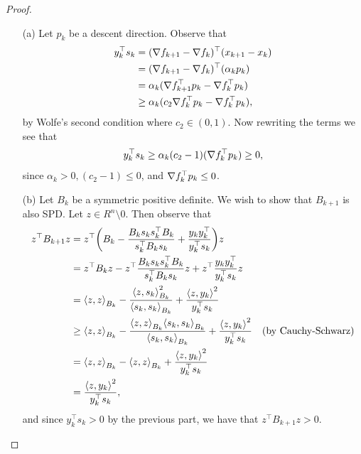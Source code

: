 \documentclass[12pt]{report}
\begin{document}
\begin{problem}
\begin{proof}
\begin{enumerate}
    \item [(a)]
    Let $p_k$ be a descent direction. Observe that
    \begin{align*}
        y_k^\top s_k &= ( {\nabla} f_{k+1} - {\nabla} f_k)^\top(x_{k+1} - x_k)\\
        &= ({\nabla} f_{k+1} - {\nabla} f_k)^\top (\alpha_k p_k)\\
        &= \alpha_k({\nabla} f_{k+1}^\top p_k - {\nabla} f_k^\top p_k)\\
        &\geq  \alpha_k(c_2{\nabla} f_{k}^\top p_k - {\nabla} f_k^\top p_k),
    \end{align*}
    by Wolfe's second condition where $c_2 \in (0,1)$. Now rewriting the terms we see that
    \[
        y_k^\top s_k \geq \alpha_k(c_2 -1)({\nabla} f_{k}^\top p_k) \geq 0,
    \]
    since $\alpha_k > 0, (c_2 - 1) \leq 0$, and ${\nabla} f_{k}^\top p_k \leq 0$. 

    \item [(b)]
    Let $B_k$ be a symmetric positive definite. We wish to show that $B_{k+1}$ is also SPD. Let $z \in R^n \setminus 0$. Then observe that
    \begin{align*}
        z^\top B_{k+1} z &= z^\top {\left(B_k - \frac{B_ks_ks_k^\top B_k}{s_k^\top B_k s_k} + \frac{y_k y_k^\top}{y_k^\top s_k}\right)} z\\
        &= z^\top B_k z - z^\top \frac{B_ks_ks_k^\top B_k}{s_k^\top B_k s_k}z + z^\top \frac{y_k y_k^\top}{y_k^\top s_k} z\\
        &= {\left\langle z,z\right\rangle}_{B_k} - \frac{{\left\langle z,s_k\right\rangle}_{B_k}^2}{{\left\langle s_k,s_k\right\rangle}_{B_k}}  + \frac{{\left\langle z,y_k\right\rangle}^2}{y_k^\top s_k}  \\
        &\geq  {\left\langle z,z\right\rangle}_{B_k}  - \frac{{\left\langle z,z\right\rangle}_{B_k}{\left\langle s_k,s_k\right\rangle}_{B_k}}{{\left\langle s_k,s_k\right\rangle}_{B_k}} + \frac{{\left\langle z,y_k\right\rangle}^2}{y_k^\top s_k} \quad (\text{by Cauchy-Schwarz})\\
        &= {\left\langle z,z\right\rangle}_{B_k} - {\left\langle z,z\right\rangle}_{B_k} + \frac{{\left\langle z,y_k\right\rangle}^2}{y_k^\top s_k}\\
        &= \frac{{\left\langle z,y_k\right\rangle}^2}{y_k^\top s_k},
    \end{align*}
    and since $y_k^\top s_k > 0$ by the previous part, we have that $z^\top B_{k+1} z > 0$. 

\end{enumerate}





\end{proof}
\end{problem}
\end{document}
